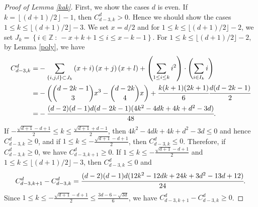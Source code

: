 \documentclass[12pt]{amsart}
\theoremstyle{definition}
\theoremstyle{remark}
\numberwithin{equation}{section}
\def\NZQ{\mathbb}               %
\def\ZZ{{\NZQ Z}}
\begin{document}
\begin{proof}[Proof of Lemma \ref{kak}]
	First, we show the cases $d$ is even.
	If $k=\left\lfloor (d+1)/2 \right\rfloor -1$, then $C_{d-3,k}^d>0$.
	Hence we should show the cases $1 \leq k \leq \lfloor(d+1)/2\rfloor-3$.
	We set $x=d/2$ and for $1 \leq k \leq \lfloor(d+1)/2\rfloor-2$, 
	we set $J_k=\left\{i \in \ZZ \ : \  -x+k+1\leq i \leq x-k-1 \right\}.$
	For $1 \leq k \leq \lfloor(d+1)/2\rfloor-2$, by Lemma \ref{poly}, we have
		\begin{displaymath}
		\begin{aligned}
			C_{d-3,k}^d %
			=&-\sum\limits_{\left\{i,j,l\right\}\subset J_k}\left(x+i\right)\left(x+j\right)\left(x+l\right)+\left(\sum\limits_{1 \leq i \leq k}i^2\right)\cdot\left(\sum\limits_{i\in I_k}i\right)\\
			=&-\left(\binom{d-2k-1}{3}x^3-\binom{d-2k}{4}x\right)+\cfrac{k(k+1)(2k+1)}{6}\cfrac{d(d-2k-1)}{2}\\
			=&-\cfrac{(d-2)(d-1)d(d-2k-1)(4k^2-4dk+4k+d^2-3d)}{48}.
		\end{aligned} 
		\end{displaymath}
		If $-\frac{\sqrt{d+1}-d+1}{2} \leq k \leq \frac{\sqrt{d+1}+d-1}{2}$, then $4k^2-4dk+4k+d^2-3d \leq 0$ and hence $C_{d-3,k}^d\geq0$, and if $1 \leq k \leq -\frac{\sqrt{d+1}-d+1}{2} $, then $C_{d-3,k}^d\leq0$.
		Therefore, if $C_{d-3,k}^d\geq0$, we have $C_{d-3,k+1}^d\geq0$.
		If $1 \leq k \leq -\frac{\sqrt{d+1}-d+1}{2}$ and $1 \leq k \leq \lfloor(d+1)/2\rfloor-3$, then $C_{d-3,k}^d\leq0$ and
		\begin{displaymath}
		\begin{aligned}
		C_{d-3,k+1}^d-C_{d-3,k}^d=\cfrac{(d-2)(d-1)d(12k^2-12dk+24k+3d^2-13d+12)}{24}.
		\end{aligned} 
		\end{displaymath}
		Since $1 \leq k \leq -\frac{\sqrt{d+1}-d+1}{2} \leq \frac{3d-6-\sqrt{3d}}{6}$, we have $C_{d-3,k+1}^d-C_{d-3,k}^d \geq 0$.
		

\end{proof}
\end{document}
